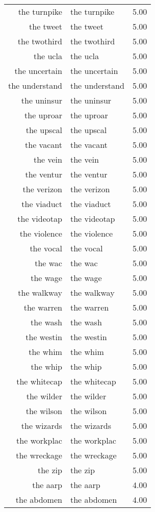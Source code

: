 \begin{table}[ht]
\begin{tabular}{rlr}
  the turnpike & the turnpike & 5.00 \\ 
  the tweet & the tweet & 5.00 \\ 
  the twothird & the twothird & 5.00 \\ 
  the ucla & the ucla & 5.00 \\ 
  the uncertain & the uncertain & 5.00 \\ 
  the understand & the understand & 5.00 \\ 
  the uninsur & the uninsur & 5.00 \\ 
  the uproar & the uproar & 5.00 \\ 
  the upscal & the upscal & 5.00 \\ 
  the vacant & the vacant & 5.00 \\ 
  the vein & the vein & 5.00 \\ 
  the ventur & the ventur & 5.00 \\ 
  the verizon & the verizon & 5.00 \\ 
  the viaduct & the viaduct & 5.00 \\ 
  the videotap & the videotap & 5.00 \\ 
  the violence & the violence & 5.00 \\ 
  the vocal & the vocal & 5.00 \\ 
  the wac & the wac & 5.00 \\ 
  the wage & the wage & 5.00 \\ 
  the walkway & the walkway & 5.00 \\ 
  the warren & the warren & 5.00 \\ 
  the wash & the wash & 5.00 \\ 
  the westin & the westin & 5.00 \\ 
  the whim & the whim & 5.00 \\ 
  the whip & the whip & 5.00 \\ 
  the whitecap & the whitecap & 5.00 \\ 
  the wilder & the wilder & 5.00 \\ 
  the wilson & the wilson & 5.00 \\ 
  the wizards & the wizards & 5.00 \\ 
  the workplac & the workplac & 5.00 \\ 
  the wreckage & the wreckage & 5.00 \\ 
  the zip & the zip & 5.00 \\ 
  the aarp & the aarp & 4.00 \\ 
  the abdomen & the abdomen & 4.00 \\ 

\end{tabular}
\end{table}
